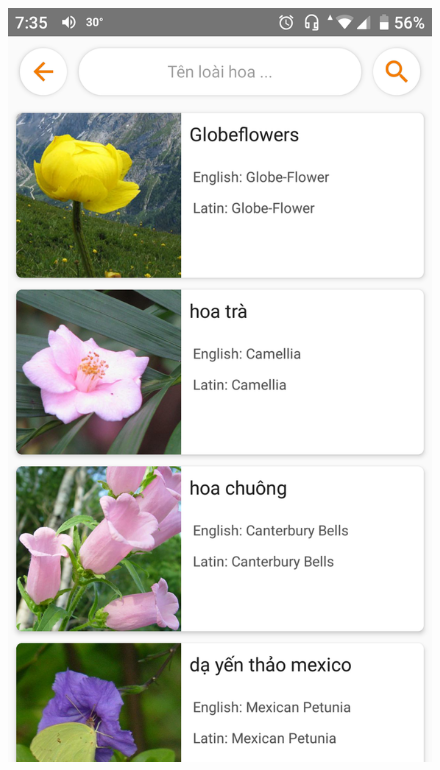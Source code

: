 \documentclass[12pt]{report}
\begin{document}
		
		\begin{figure}[h]
			\centering
			\includegraphics[scale=0.2]{app_search_name2}

\end{figure}
\end{document}
